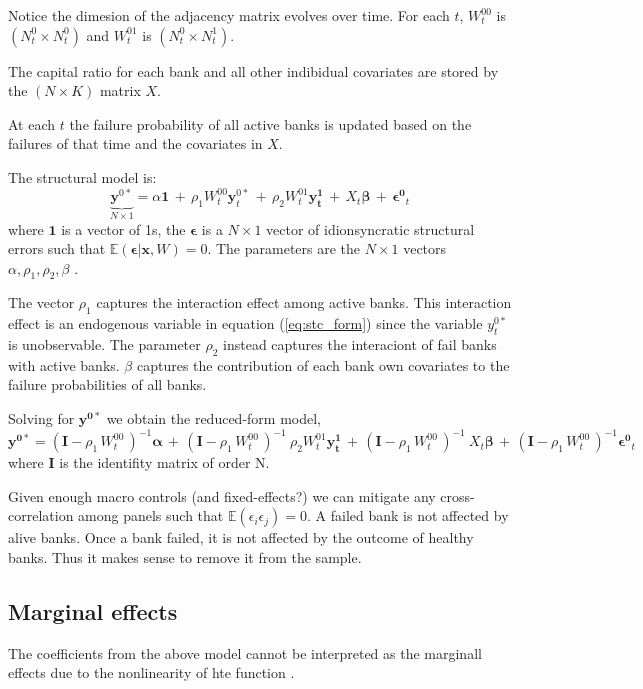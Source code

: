 \documentclass[11pt,final]{article}%
\newcommand{\vect}[1]{\bm{#1}} %
\begin{document}
Notice the dimesion of the adjacency matrix evolves over time. For each $t$, $W^{00}_{t}$ is $(N^{0}_{t} \times N^{0}_{t})$ and $W^{01}_{t}$ is $(N^{0}_{t} \times N^{1}_{t})$.

The capital ratio for each bank and all other indibidual covariates are stored by the $(N \times K)$ matrix $X$.

At each $t$ the failure probability of all active banks is updated based on the failures of that time and the covariates in $X$. 

The structural model is:
\begin{equation}
	\underbrace{\vect{y}^{0*}}_{N \times 1} = \alpha \vect{1} \,+\, \rho_{1}  W^{00}_{t} \vect{y}^{0*}_{t} \,+\, \rho_{2} W^{01}_{t} \vect{y^{1}_{t}}  \,+\, X_{t} \vect{\beta} \,+\, \vect{\epsilon^{0}}_{t}
    \label{eq:stc_form}
\end{equation}
where $\vect{1}$ is a vector of 1s, the $\vect{\epsilon}$ is a $N \times 1$ vector of idionsyncratic structural errors such that $\mathbb{E}(\vect{\epsilon} | \vect{x}, W)=0$. 
The parameters are the $N \times 1$ vectors $\alpha, \rho_1, \rho_2, \beta$ . 

The vector $\rho_1$ captures the interaction effect among active banks.  This interaction effect is an endogenous variable in equation (\ref{eq:stc_form}) since the variable $y_{t}^{0*}$ is unobservable. The parameter $\rho_2$ instead captures the interaciont of fail banks with active banks. $\beta$ captures the contribution of each bank own covariates to the failure probabilities of all banks. 

Solving for $\vect{y^{0*}}$ we obtain the reduced-form model,
\begin{equation}
\vect{y^{0*}} = (\vect{I} - \rho_1 \, W^{00}_{t} \, )^{-1} \vect{\alpha} \,+\, (\vect{I} - \rho_1 \, W^{00}_{t} \, )^{-1} \: \rho_{2} W^{01}_{t} \vect{y^{1}_{t}} \,+\, (\vect{I} - \rho_1 \, W^{00}_{t} \, )^{-1} \: X_{t} \vect{\beta}  \,+\, (\vect{I} - \rho_1 \, W^{00}_{t} \, )^{-1}   \vect{\epsilon^{0}}_{t}
\end{equation}
where $\vect{I}$ is the identifity matrix of order N.

Given enough macro controls (and fixed-effects?) we can mitigate any cross-correlation among panels such that $\mathbb{E}(\epsilon_{i} \epsilon_{j}) = 0$. 
A failed bank is not affected by alive banks. Once a bank failed, it is not affected by the outcome of healthy banks. Thus it makes sense to remove it from the sample.


\subsection{Marginal effects}
The coefficients from the above model cannot be interpreted as the marginall effects due to the nonlinearity of hte function . 
\end{document}
